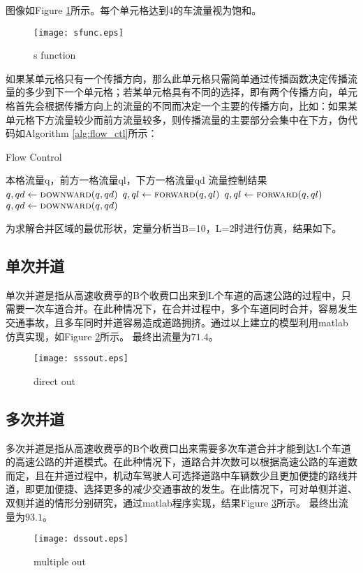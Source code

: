 \documentclass{mcmthesis}
\begin{document}
图像如Figure \ref{fig:s_func}所示。每个单元格达到4的车流量视为饱和。
\begin{figure}[!htbp]
	\small
	\centering
	\texttt{[image: sfunc.eps]}
	\caption{s function} 
	\label{fig:s_func}
\end{figure}
如果某单元格只有一个传播方向，那么此单元格只需简单通过传播函数决定传播流量的多少到下一个单元格；若某单元格具有不同的选择，即有两个传播方向，单元格首先会根据传播方向上的流量的不同而决定一个主要的传播方向，比如：如果某单元格下方流量较少而前方流量较多，则传播流量的主要部分会集中在下方，伪代码如Algorithm \ref{alg:flow_ctl}所示：
\begin{algorithm}
	\begin{algorithmic}
	\caption{Flow Control}
	\label{alg:flow_ctl}
        \Require $\text{本格流量q，前方一格流量ql，下方一格流量qd}$
		\Ensure $\text{流量控制结果}$
					\State $q,qd \gets \Call{downward}{q,qd}$
					\State $q,ql \gets \Call{forward}{q,ql}$
				\Else
					\State $q,ql \gets \Call{forward}{q,ql}$
					\State $q,qd \gets \Call{downward}{q,qd}$
			\EndIf
			\State {}
		\EndFunction
\end{algorithmic}
\end{algorithm}

为求解合并区域的最优形状，定量分析当B=10，L=2时进行仿真，结果如下。
\subsection{单次并道}
单次并道是指从高速收费亭的B个收费口出来到L个车道的高速公路的过程中，只需要一次车道合并。在此种情况下，在合并过程中，多个车道同时合并，容易发生交通事故，且多车同时并道容易造成道路拥挤。通过以上建立的模型利用matlab仿真实现，如Figure \ref{fig:direct_out}所示。
最终出流量为$71.4$。
\begin{figure}[!htbp]
	\small
	\centering
	\texttt{[image: sssout.eps]}
	\caption{direct out} 
	\label{fig:direct_out}
\end{figure}
\subsection{多次并道}
多次并道是指从高速收费亭的B个收费口出来需要多次车道合并才能到达L个车道的高速公路的并道模式。在此种情况下，道路合并次数可以根据高速公路的车道数而定，且在并道过程中，机动车驾驶人可选择道路中车辆数少且更加便捷的路线并道，即更加便捷、选择更多的减少交通事故的发生。在此情况下，可对单侧并道、双侧并道的情形分别研究，通过matlab程序实现，结果Figure \ref{fig:multiple_out}所示。
最终出流量为$93.1$。
\begin{figure}[!htbp]
	\small
	\centering
	\texttt{[image: dssout.eps]}
	\caption{multiple out} 
	\label{fig:multiple_out}
\end{figure}
\end{document}
